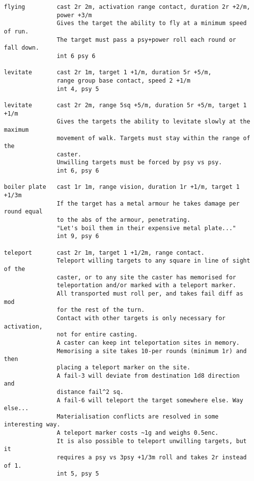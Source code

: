 \begin{verbatim}
flying         cast 2r 2m, activation range contact, duration 2r +2/m,
               power +3/m
               Gives the target the ability to fly at a minimum speed of run.
               The target must pass a psy+power roll each round or fall down.
               int 6 psy 6

levitate       cast 2r 1m, target 1 +1/m, duration 5r +5/m,
               range group base contact, speed 2 +1/m
               int 4, psy 5

levitate       cast 2r 2m, range 5sq +5/m, duration 5r +5/m, target 1 +1/m
               Gives the targets the ability to levitate slowly at the maximum
               movement of walk. Targets must stay within the range of the
               caster.
               Unwilling targets must be forced by psy vs psy.
               int 6, psy 6

boiler plate   cast 1r 1m, range vision, duration 1r +1/m, target 1 +1/3m
               If the target has a metal armour he takes damage per round equal
               to the abs of the armour, penetrating.
               "Let's boil them in their expensive metal plate..."
               int 9, psy 6

teleport       cast 2r 1m, target 1 +1/2m, range contact.
               Teleport willing targets to any square in line of sight of the
               caster, or to any site the caster has memorised for
               teleportation and/or marked with a teleport marker.
               All transported must roll per, and takes fail diff as mod
               for the rest of the turn.
               Contact with other targets is only necessary for activation,
               not for entire casting.
               A caster can keep int teleportation sites in memory.
               Memorising a site takes 10-per rounds (minimum 1r) and then
               placing a teleport marker on the site.
               A fail-3 will deviate from destination 1d8 direction and
               distance fail^2 sq.
               A fail-6 will teleport the target somewhere else. Way else...
               Materialisation conflicts are resolved in some interesting way.
               A teleport marker costs ~1g and weighs 0.5enc.
               It is also possible to teleport unwilling targets, but it
               requires a psy vs 3psy +1/3m roll and takes 2r instead of 1.
               int 5, psy 5


\end{verbatim}
